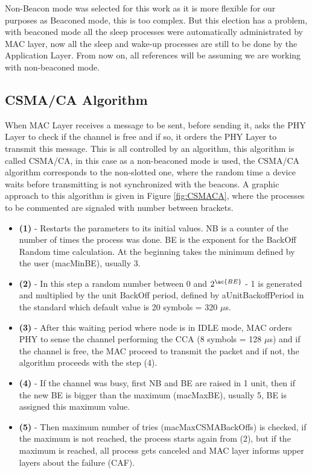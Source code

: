 Non-Beacon mode was selected for this work as it is more flexible for our purposes as Beaconed mode, this is too complex. But
this election has a problem, with beaconed mode all the sleep processes were automatically administrated by \ac{MAC} layer, now all the sleep 
and wake-up processes are still to be done by the Application Layer. From now on, all references will be assuming we are working with non-beaconed
mode.

\subsection{\ac{CSMA/CA} Algorithm}

When \ac{MAC} Layer receives a message to be sent, before sending it, asks the \ac{PHY} Layer to check if the channel is free and if so, it 
orders the \ac{PHY} Layer to transmit this message. This is all controlled by an algorithm, this algorithm is called \ac{CSMA/CA}, in this 
case as a non-beaconed mode is used, the \ac{CSMA/CA} algorithm corresponds to the non-slotted one, where the random time a device waits 
before transmitting is not synchronized with the beacons. A graphic approach to this algorithm is given in Figure \ref{fig:CSMACA}, where the
processes to be commented are signaled with number between brackets.

\begin{itemize}
 \item \textbf{(1)} - Restarts the parameters to its initial values. \ac{NB} is a counter of the number of times the process was done. \ac{BE}
is the exponent for the BackOff Random time calculation. At the beginning takes the minimum defined by the user (macMinBE), usually 3.
 \item \textbf{(2)} - In this step a random number between 0 and $2^{\ac{BE}}$ - 1 is generated and multiplied by the unit BackOff period, defined
by aUnitBackoffPeriod in the standard which default value is 20 symbols = 320 $\mu$s.
 \item \textbf{(3)} - After this waiting period where node is in IDLE mode, \ac{MAC} orders \ac{PHY} to sense the channel performing the \ac{CCA} 
(8 symbols = 128 $\mu$s) and if the channel is free, the \ac{MAC} proceed to transmit the packet and if not, the algorithm proceeds with the 
step (4).
 \item \textbf{(4)} - If the channel was busy, first \ac{NB} and \ac{BE} are raised in 1 unit, then if the new \ac{BE} is bigger than the maximum
(macMaxBE), usually 5, \ac{BE} is assigned this maximum value.
 \item \textbf{(5)} - Then maximum number of tries (macMaxCSMABackOffs) is checked, if the maximum is not reached, the process starts again from (2),
but if the maximum is reached, all process gets canceled and \ac{MAC} layer informs upper layers about the failure (\ac{CAF}).
\end{itemize}

